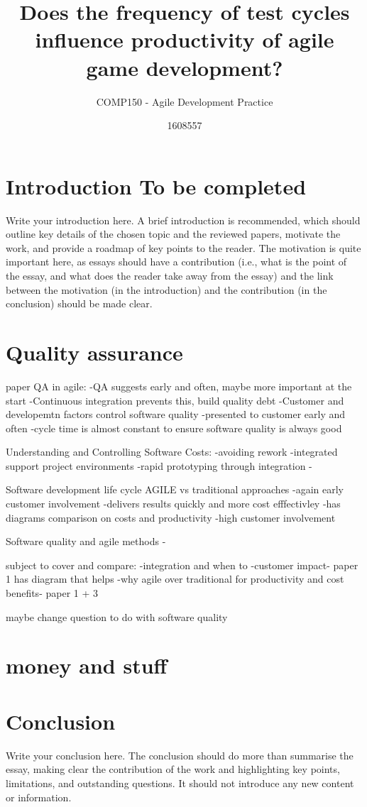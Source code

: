 \documentclass{scrartcl}
\title{Does the frequency of test cycles influence productivity of agile game development? }
\subtitle{COMP150 - Agile Development Practice}
\author{1608557}
\begin{document}
\maketitle



\section{Introduction To be completed}

Write your introduction here. A brief introduction is recommended, which should outline key details of the chosen topic and the reviewed papers, motivate the work, and provide a roadmap of key points to the reader. The motivation is quite important here, as essays should have a contribution (i.e., what is the point of the essay, and what does the reader take away from the essay) and the link between the motivation (in the introduction) and the contribution (in the conclusion) should be made clear.

\section{Quality assurance}

paper QA in agile:
-QA suggests early and often, maybe more important at the start 
-Continuous integration prevents this, build quality debt
-Customer and developemtn factors control software quality
-presented to customer early and often
-cycle time is almost constant to ensure software quality is always good

Understanding and Controlling Software Costs:
-avoiding rework
-integrated support project environments 
-rapid prototyping through integration
-

Software development life cycle AGILE vs traditional approaches
-again early customer involvement 
-delivers results quickly and more cost efffectivley 
-has diagrams comparison on costs and productivity 
-high customer involvement 

Software quality and agile methods
-

subject to cover and compare:
-integration and when to 
-customer impact- paper 1 has diagram that helps
-why agile over traditional for productivity and cost benefits- paper 1 + 3

maybe change question to do with software quality


\section{money and stuff}






\section{Conclusion}

Write your conclusion here. The conclusion should do more than summarise the essay, making clear the contribution of the work and highlighting key points, limitations, and outstanding questions. It should not introduce any new content or information.



\end{document}
